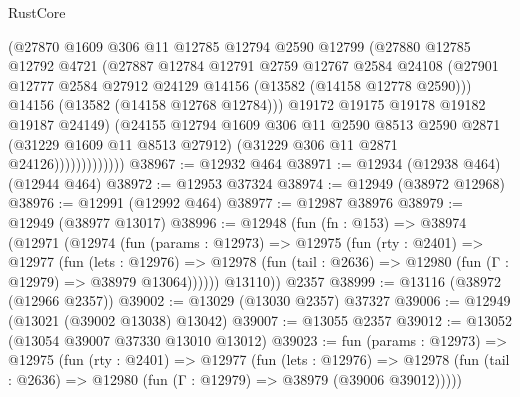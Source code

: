 \begin{lexlean}{RustCore}
\begin{coremodule}
                        (@27870
                          @1609
                          @306
                          @11
                          @12785
                          @12794
                          @2590
                          @12799
                          (@27880
                            @12785
                            @12792
                            @4721
                            (@27887
                              @12784
                              @12791
                              @2759
                              @12767
                              @2584
                              @24108
                              (@27901
                                @12777
                                @2584
                                @27912
                                @24129
                                @14156
                                (@13582 (@14158 @12778 @2590)))
                              @14156
                              (@13582 (@14158 @12768 @12784)))
                            @19172
                            @19175
                            @19178
                            @19182
                            @19187
                            @24149)
                          (@24155
                            @12794
                            @1609
                            @306
                            @11
                            @2590
                            @8513
                            @2590
                            @2871
                            (@31229 @1609 @11 @8513 @27912)
                            (@31229 @306 @11 @2871 @24126)))))))))))))
@38967 := @12932 @464
@38971 := @12934 (@12938 @464) (@12944 @464)
@38972 := @12953 @37324
@38974 := @12949 (@38972 @12968)
@38976 := @12991 (@12992 @464)
@38977 := @12987 @38976
@38979 := @12949 (@38977 @13017)
@38996 := @12948
    (fun (fn : @153) =>
    @38974
      (@12971
        (@12974
          (fun (params : @12973) =>
          @12975
            (fun (rty : @2401) =>
            @12977
              (fun (lets : @12976) =>
              @12978 (fun (tail : @2636) => @12980 (fun (Γ : @12979) => @38979 @13064))))))
        @13110))
    @2357
@38999 := @13116 (@38972 (@12966 @2357))
@39002 := @13029 (@13030 @2357) @37327
@39006 := @12949 (@13021 (@39002 @13038) @13042)
@39007 := @13055 @2357
@39012 := @13052 (@13054 @39007 @37330 @13010 @13012)
@39023 := fun (params : @12973) =>
  @12975
    (fun (rty : @2401) =>
    @12977
      (fun (lets : @12976) =>
      @12978 (fun (tail : @2636) => @12980 (fun (Γ : @12979) => @38979 (@39006 @39012)))))

\end{coremodule}
\end{lexlean}
